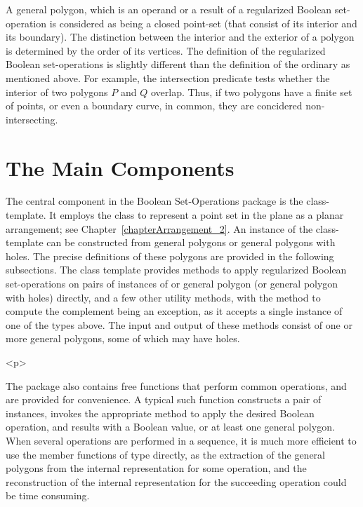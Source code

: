 A general polygon, which is an operand or a result of a regularized
Boolean set-operation is considered as being a closed point-set (that
consist of its interior and its boundary). The distinction between the
interior and  the exterior of a polygon is determined by the order of
its vertices. The definition of the regularized Boolean set-operations 
is slightly different than the definition of the ordinary as mentioned
above. For example, the intersection predicate tests whether the
interior of two polygons $P$ and $Q$ overlap. Thus, if two polygons
have a finite set of points, or even a boundary curve, in common, they
are concidered non-intersecting.

\section{The Main Components}
\label{bobs_sec:main_components}
The central component in the Boolean Set-Operations package is the
 class-template. It employs the
 class to represent a point set in the plane as a
planar arrangement; see Chapter~\ref{chapterArrangement_2}. 
An instance of the  class-template can be
constructed from general polygons or general polygons with holes. The
precise definitions of these polygons are provided in the following
subsections. The class template provides methods to apply regularized 
Boolean set-operations on pairs of instances of  
or general polygon (or general polygon with holes) directly, and a few
other utility methods, with the method to compute the complement being 
an exception, as it accepts a single instance of one of the types above. 
The input and output of these methods consist of one or more general 
polygons, some of which may have holes.

\begin{ccHtmlOnly}<p>\end{ccHtmlOnly}
The package also contains free functions that perform common operations,
and are provided for convenience. A typical such function constructs a pair
of  instances, invokes the appropriate method to
apply the desired Boolean operation, and results with a Boolean value, or at
least one general polygon. When several operations are performed in a 
sequence, it is much more efficient to use the member functions of
 type directly, as the extraction of the general
polygons from the internal representation for some operation, and the
reconstruction of the internal representation for the succeeding operation
could be time consuming.

